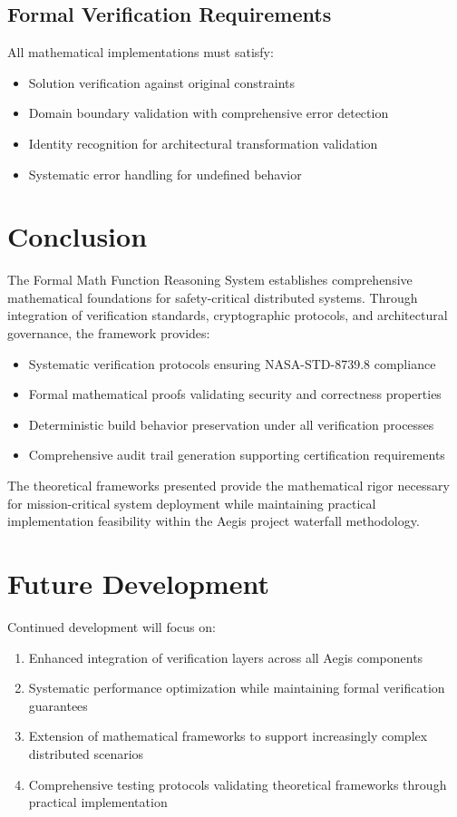 \documentclass{article}
\begin{document}
\subsection{Formal Verification Requirements}

All mathematical implementations must satisfy:
\begin{itemize}
    \item Solution verification against original constraints
    \item Domain boundary validation with comprehensive error detection
    \item Identity recognition for architectural transformation validation
    \item Systematic error handling for undefined behavior
\end{itemize}

\section{Conclusion}

The Formal Math Function Reasoning System establishes comprehensive mathematical foundations for safety-critical distributed systems. Through integration of verification standards, cryptographic protocols, and architectural governance, the framework provides:

\begin{itemize}
    \item Systematic verification protocols ensuring NASA-STD-8739.8 compliance
    \item Formal mathematical proofs validating security and correctness properties
    \item Deterministic build behavior preservation under all verification processes
    \item Comprehensive audit trail generation supporting certification requirements
\end{itemize}

The theoretical frameworks presented provide the mathematical rigor necessary for mission-critical system deployment while maintaining practical implementation feasibility within the Aegis project waterfall methodology.

\section*{Future Development}

Continued development will focus on:
\begin{enumerate}
    \item Enhanced integration of verification layers across all Aegis components
    \item Systematic performance optimization while maintaining formal verification guarantees
    \item Extension of mathematical frameworks to support increasingly complex distributed scenarios
    \item Comprehensive testing protocols validating theoretical frameworks through practical implementation
\end{enumerate}
\end{document}

